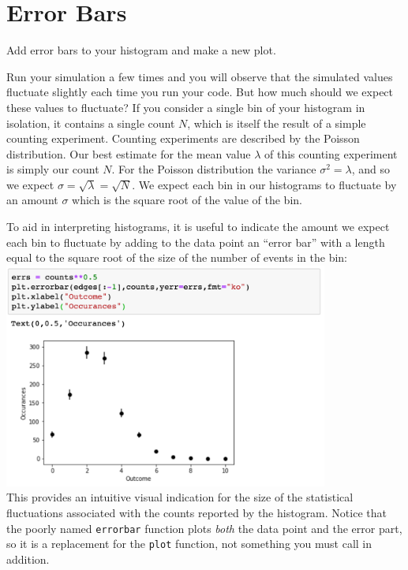 \section{Error Bars}

\begin{plot} Add error bars to your histogram and make a new plot.
\end{plot}
Run your simulation a few times and you will observe that the
simulated values fluctuate slightly each time you run your code.  But
how much should we expect these values to fluctuate?  If you consider
a single bin of your histogram in isolation, it contains a single
count $N$, which is itself the result of a simple counting experiment.
Counting experiments are described by the Poisson distribution.  Our
best estimate for the mean value $\lambda$ of this counting experiment
is simply our count $N$.  For the Poisson distribution the variance
$\sigma^2=\lambda$, and so we expect $\sigma = \sqrt{\lambda} =
\sqrt{N}$.  We expect each bin in our histograms to fluctuate by an
amount $\sigma$ which is the square root of the value of the bin.

To aid in interpreting histograms, it is useful to indicate the amount
we expect each bin to fluctuate by adding to the data point an ``error
bar'' with a length equal to the square root of the size of the number
of events in the
bin:\\ 
\includegraphics[width=0.8\textwidth]{figs/labs/distributions/plotbars.png}\\ 
This provides an intuitive visual indication for the size of the
statistical fluctuations associated with the counts reported by the
histogram.  Notice that the poorly named {\tt errorbar} function plots
{\em both} the data point and the error part, so it is a replacement
for the {\tt plot} function, not something you must call in addition.


